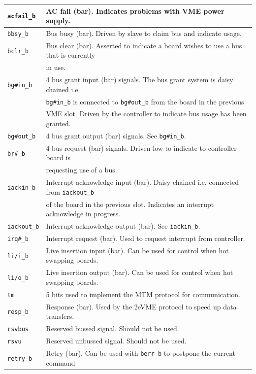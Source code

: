 \documentclass[10pt,a4paper]{article}
\begin{document}
\begin{table}[H]
\begin{tabular}{|l|l|}
\texttt{acfail\_b}& AC fail (bar). Indicates problems with VME power supply.\\ \hline
\texttt{bbsy\_b}& Bus busy (bar). Driven by slave to claim bus and indicate usage.\\ \hline
\texttt{bclr\_b}& Bus clear (bar). Asserted to indicate a board wishes to use a bus that is currently \\
                & in use.\\
\texttt{bg\#in\_b}& 4 bus grant input (bar) signals. The bus grant system is daisy chained i.e.\\
               & \texttt{bg\#in\_b} is connected to \texttt{bg\#out\_b} from the board in the previous\\ 
							 &  VME slot. Driven by the controller to indicate bus usage has been granted.\\ \hline
\texttt{bg\#out\_b}& 4 bus grant output (bar) signals. See \texttt{bg\#in\_b}.\\ \hline
\texttt{br\#\_b}& 4 bus request (bar) signals. Driven low to indicate to controller board is\\
                & requesting use of a bus.\\ \hline
\texttt{iackin\_b}& Interrupt acknowledge input (bar). Daisy chained i.e. connected from \texttt{iackout\_b}\\
               & of the board in the previous slot. Indicates an interrupt acknowledge in progress.\\ \hline
\texttt{iackout\_b}& Interrupt acknowledge output (bar). See \texttt{iackin\_b}.\\ \hline
\texttt{irq\#\_b}& Interrupt request (bar). Used to request interrupt from controller.\\ \hline
\texttt{li/i\_b}& Live insertion input (bar). Can be used for control when hot swapping boards.\\ \hline
\texttt{li/o\_b}& Live insertion output (bar). Can be used for control when hot swapping boards.\\ \hline
\texttt{tm}& 5 bits used to implement the MTM protocol for communication.\\ \hline
\texttt{resp\_b}& Response (bar). Used by the 2eVME protocol to speed up data transfers. \\ \hline
\texttt{rsvbus}& Reserved bussed signal. Should not be used. \\ \hline
\texttt{rsvu}& Reserved unbussed signal. Should not be used. \\ \hline
\texttt{retry\_b}& Retry (bar). Can be used with \texttt{berr\_b} to postpone the current command\\

\end{tabular}
\end{table}
\end{document}
